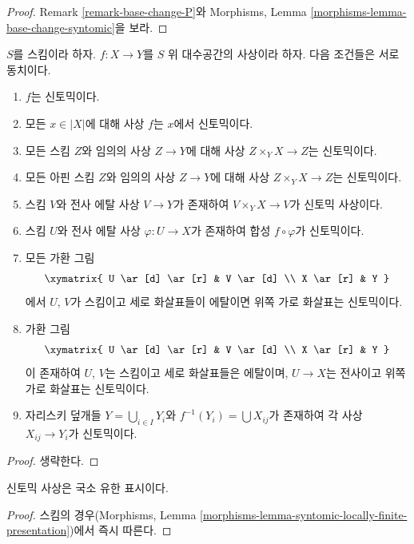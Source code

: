 \begin{proof}
Remark \ref{remark-base-change-P}와 Morphisms, Lemma
\ref{morphisms-lemma-base-change-syntomic}을 보라.
\end{proof}

\begin{lemma}
\label{lemma-syntomic-local}
$S$를 스킴이라 하자.
$f : X \to Y$를 $S$ 위 대수공간의 사상이라 하자.
다음 조건들은 서로 동치이다.
\begin{enumerate}
\item $f$는 신토믹이다.
\item 모든 $x \in |X|$에 대해 사상 $f$는 $x$에서 신토믹이다.
\item 모든 스킴 $Z$와 임의의 사상 $Z \to Y$에 대해 사상
$Z \times_Y X \to Z$는 신토믹이다.
\item 모든 아핀 스킴 $Z$와 임의의 사상 $Z \to Y$에 대해 사상
$Z \times_Y X \to Z$는 신토믹이다.
\item 스킴 $V$와 전사 에탈 사상 $V \to Y$가 존재하여
$V \times_Y X \to V$가 신토믹 사상이다.
\item 스킴 $U$와 전사 에탈 사상 $\varphi : U \to X$가 존재하여
합성 $f \circ \varphi$가 신토믹이다.
\item 모든 가환 그림
$$
\xymatrix{
U \ar[d] \ar[r] & V \ar[d] \\
X \ar[r] & Y
}
$$
에서 $U$, $V$가 스킴이고 세로 화살표들이 에탈이면 위쪽 가로
화살표는 신토믹이다.
\item 가환 그림
$$
\xymatrix{
U \ar[d] \ar[r] & V \ar[d] \\
X \ar[r] & Y
}
$$
이 존재하여 $U$, $V$는 스킴이고 세로 화살표들은 에탈이며,
$U \to X$는 전사이고 위쪽 가로 화살표는 신토믹이다.
\item 자리스키 덮개들 $Y = \bigcup_{i \in I} Y_i$와
$f^{-1}(Y_i) = \bigcup X_{ij}$가 존재하여 각 사상
$X_{ij} \to Y_i$가 신토믹이다.
\end{enumerate}
\end{lemma}

\begin{proof}
생략한다.
\end{proof}

\begin{lemma}
\label{lemma-syntomic-locally-finite-presentation}
신토믹 사상은 국소 유한 표시이다.
\end{lemma}

\begin{proof}
스킴의 경우(Morphisms, Lemma
\ref{morphisms-lemma-syntomic-locally-finite-presentation})에서
즉시 따른다.
\end{proof}

